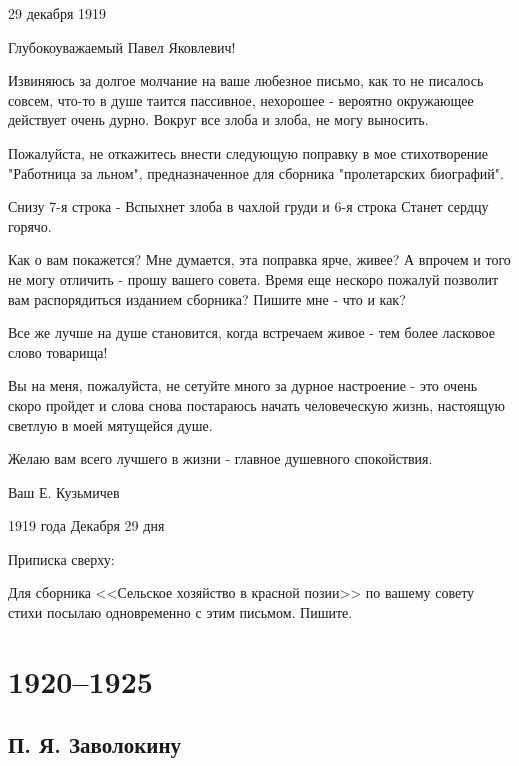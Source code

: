 \documentclass[]{memoir}
\begin{document}
29 декабря 1919







Глубокоуважаемый Павел Яковлевич!

Извиняюсь за долгое молчание на ваше любезное письмо, как то не писалось совсем, что-то в душе таится пассивное, нехорошее - вероятно окружающее действует очень дурно. Вокруг все злоба и злоба, не могу выносить.

Пожалуйста, не откажитесь внести следующую поправку в мое стихотворение "Работница за льном", предназначенное для сборника "пролетарских биографий".

Снизу 7-я строка -
Вспыхнет злоба в чахлой груди
и 6-я строка
Станет сердцу горячо.

Как о вам покажется? Мне думается, эта поправка ярче, живее? А впрочем и того не могу отличить - прошу вашего совета. Время еще нескоро пожалуй позволит вам распорядиться изданием сборника? Пишите мне - что и как?

Все же лучше на душе становится, когда встречаем живое - тем более ласковое слово товарища!

Вы на меня, пожалуйста, не сетуйте много за дурное настроение - это очень скоро пройдет и слова снова постараюсь начать человеческую жизнь, настоящую светлую в моей мятущейся душе.

Желаю вам всего лучшего в жизни - главное душевного спокойствия.

Ваш Е. Кузьмичев

1919 года Декабря 29 дня

Приписка сверху:

Для сборника <<Сельское хозяйство в красной позии>> по вашему совету стихи посылаю одновременно с этим письмом. Пишите.


\chapter{1920--1925}
\section{П. Я. Заволокину}
\end{document}
